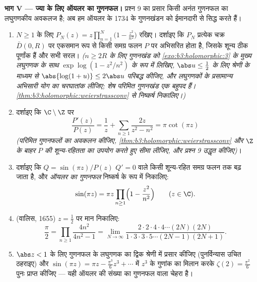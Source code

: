\begin{problem}
\medskip
\noindent\textbf{भाग V --- ज्या के लिए ऑयलर का गुणनफल।} प्रश्न 9
का प्रसार किसी अनंत गुणनफल का लघुगणकीय अवकलज है; अब हम ऑयलर के
1734 के गुणनखंडन को ईमानदारी से सिद्ध करते हैं।
\begin{enumerate}[resume]
  \item $N \geq 1$ के लिए $P_N(z) =
        z\prod_{n=1}^{N}\bigl(1 - \frac{z^2}{n^2}\bigr)$ रखिए। दर्शाइए कि $P_N$ प्रत्येक चक्र
        $\bar D(0, R)$ पर एकसमान रूप से किसी समग्र फलन $P$ पर अभिसरित
        होता है, जिसके शून्य ठीक पूर्णांक हैं और सभी सरल।
        \emph{($n
        \geq 2R$ के लिए गुणनखंड को \cref{exo:b3:holomorphic:3} के मुख्य लघुगणक के
        साथ $\exp\log(1 -
        z^2/n^2)$ के रूप में लिखिए, $\abs u \leq \frac12$ के लिए श्रेणी के
        माध्यम से $\abs{\log(1+u)}
        \leq 2\abs u$ परिबद्ध कीजिए, और लघुगणकों के प्रसामान्य
        अभिसारी योग का चरघातांक लीजिए; शेष परिमित गुणनखंड एक
        बहुपद हैं। \cref{thm:b3:holomorphic:weierstrassconv} से निष्कर्ष निकालिए।)}
  \item दर्शाइए कि $\C\setminus\Z$ पर
        \[
        \frac{P'(z)}{P(z)} = \frac1z +
        \sum_{n\geq1}\frac{2z}{z^2 - n^2} = \pi\cot(\pi z)
        \]
        \emph{(परिमित गुणनफलों का अवकलन कीजिए, \cref{thm:b3:holomorphic:weierstrassconv} और $\Z$ के
        बाहर $P$ की शून्य-रहितता का उपयोग करते हुए सीमा लीजिए,
        और प्रश्न 9 उद्धृत कीजिए)}।
  \item दर्शाइए कि $Q = \sin(\pi z)/P(z)$ $Q' = 0$ वाले किसी शून्य-रहित समग्र फलन तक
        बढ़ जाता है, और \emph{ऑयलर का गुणनफल} निष्कर्ष के रूप में
        निकालिए:
        \[
        \sin(\pi z) = \pi z\prod_{n\geq1}
        \Bigl(1 - \frac{z^2}{n^2}\Bigr)
        \qquad (z \in \C) .
        \]
  \item (वालिस, 1655) $z = \frac12$ पर मान निकालिए:
        \[
        \frac\pi2 = \prod_{n\geq1}\frac{4n^2}{4n^2 - 1}
        = \lim_{N\to\infty}
        \frac{2\cdot2\cdot4\cdot4\cdots(2N)(2N)}
        {1\cdot3\cdot3\cdot5\cdots(2N-1)(2N+1)} .
        \]
  \item $\abs z < 1$ के लिए गुणनफल के लघुगणक का द्विक श्रेणी में प्रसार
        कीजिए (पुनर्विन्यास उचित ठहराइए) और $\sin(\pi z) = \pi z - \frac{\pi^3}6z^3 + \cdots$ में $z^3$ के
        गुणांक का मिलान करके $\zeta(2) =
        \frac{\pi^2}6$ पुनः प्राप्त कीजिए --- यही
        ऑयलर की संख्या का गुणनफल वाला चेहरा है।
\end{enumerate}


\end{problem}
